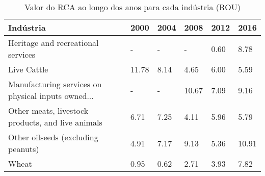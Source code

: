 \begin{table}
\centering
\caption{Valor do RCA ao longo dos anos para cada indústria (ROU)}
\label{tab:ex3-tempo-ROU}
\begin{tabular}{p{6cm}p{1.5cm}p{1.5cm}p{1.5cm}p{1.5cm}p{1.5cm}}
\toprule
                                         Indústria &  2000 & 2004 &  2008 & 2012 &  2016 \\
\midrule
                Heritage and recreational services &     - &    - &     - & 0.60 &  8.78 \\
                                       Live Cattle & 11.78 & 8.14 &  4.65 & 6.00 &  5.59 \\
Manufacturing services on physical inputs owned... &     - &    - & 10.67 & 7.09 &  9.16 \\
 Other meats, livestock products, and live animals &  6.71 & 7.25 &  4.11 & 5.96 &  5.79 \\
                Other oilseeds (excluding peanuts) &  4.91 & 7.17 &  9.13 & 5.36 & 10.91 \\
                                             Wheat &  0.95 & 0.62 &  2.71 & 3.93 &  7.82 \\
\bottomrule
\end{tabular}
\end{table}
